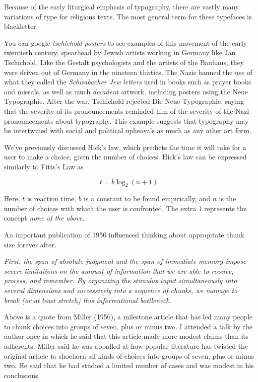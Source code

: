 Because of the early liturgical emphasis of typography, there are vastly
many variations of type for religious texts. The most general term for
these typefaces is blackletter.

\hypertarget{die-neue-typographie}{%
\label{die-neue-typographie}}

You can google \emph{tschichold posters} to see examples of this
movement of the early twentieth century, spearhead by Jewish artists
working in Germany like Jan Tschichold. Like the Gestalt psychologists
and the artists of the Bauhaus, they were driven out of Germany in the
nineteen thirties. The Nazis banned the use of what they called the
\emph{Schwabacher Jew letters} used in books such as prayer books and
missals, as well as much \emph{decadent} artwork, including posters
using the Neue Typographie. After the war, Tschichold rejected Die Neue
Typographie, saying that the severity of its pronouncements reminded him
of the severity of the Nazi pronouncements about typography. This
example suggests that typography may be intertwined with social and
political upheavals as much as any other art form.

\hypertarget{chunking-words-especially-in-menus}{%
\label{chunking-words-especially-in-menus}}

We've previously discussed Hick's law, which predicts the time it will
take for a user to make a choice, given the number of choices. Hick's
law can be expressed similarly to Fitts's Law as

\[t = b \log_2 (n + 1)\]

Here, \(t\) is reaction time, \(b\) is a constant to be found
empirically, and \(n\) is the number of choices with which the user is
confronted. The extra 1 represents the concept \emph{none of the above}.

An important publication of 1956 influenced thinking about appropriate
chunk size forever after.

\emph{First, the span of absolute judgment and the span of immediate
memory impose severe limitations on the amount of information that we
are able to receive, process, and remember. By organizing the stimulus
input simultaneously into several dimensions and successively into a
sequence of chunks, we manage to break (or at least stretch) this
informational bottleneck.}

Above is a quote from Miller (1956), a milestone article that has led
many people to chunk choices into groups of seven, plus or minus two. I
attended a talk by the author once in which he said that this article
made more modest claims than its adherents. Miller said he was appalled
at how popular literature has twisted the original article to shoehorn
all kinds of choices into groups of seven, plus or minus two. He said
that he had studied a limited number of cases and was modest in his
conclusions.

